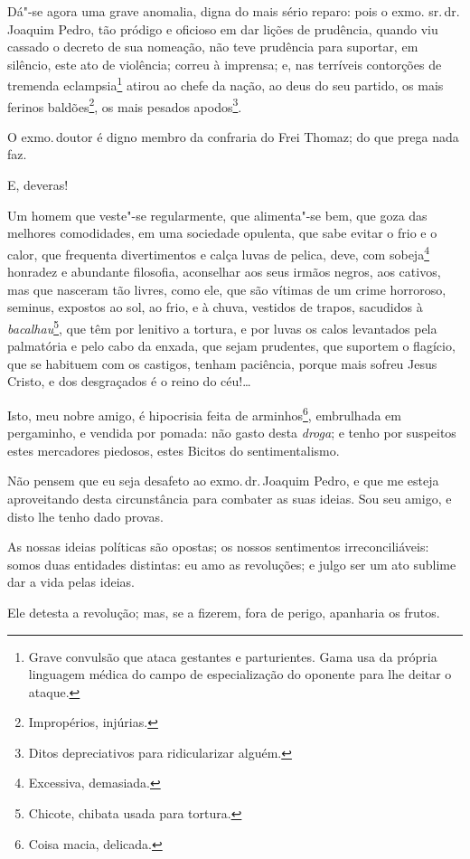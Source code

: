 Dá"-se agora uma grave anomalia, digna do mais sério reparo: pois o exmo.
sr.\,dr.\,Joaquim Pedro, tão pródigo e oficioso em dar lições de
prudência, quando viu cassado o decreto de sua nomeação, não teve
prudência para suportar, em silêncio, este ato de violência; correu à
imprensa; e, nas terríveis contorções de tremenda eclampsia\footnote{
  Grave convulsão que ataca gestantes e parturientes. Gama usa da
  própria linguagem médica do campo de especialização do oponente para
  lhe deitar o ataque.} atirou ao chefe da nação, ao deus do seu
partido, os mais ferinos baldões\footnote{Impropérios, injúrias.}, os
mais pesados apodos\footnote{Ditos depreciativos para ridicularizar
  alguém.}.

O exmo.\,doutor é digno membro da confraria do Frei Thomaz; do que prega
nada faz.

E, deveras!

Um homem que veste"-se regularmente, que alimenta"-se bem, que goza das
melhores comodidades, em uma sociedade opulenta, que sabe evitar o frio
e o calor, que frequenta divertimentos e calça luvas de pelica, deve,
com sobeja\footnote{Excessiva, demasiada.} honradez e abundante
filosofia, aconselhar aos seus irmãos negros, aos cativos, mas que
nasceram tão livres, como ele, que são vítimas de um crime horroroso,
seminus, expostos ao sol, ao frio, e à chuva, vestidos de trapos,
sacudidos à \emph{bacalhau}\footnote{Chicote, chibata usada para
  tortura.}, que têm por lenitivo a tortura, e por luvas os calos
levantados pela palmatória e pelo cabo da enxada, que sejam prudentes,
que suportem o flagício, que se habituem com os castigos, tenham
paciência, porque mais sofreu Jesus Cristo, e dos desgraçados é o reino
do céu!\ldots{}

Isto, meu nobre amigo, é hipocrisia feita de arminhos\footnote{Coisa
  macia, delicada.}, embrulhada em pergaminho, e vendida por pomada: não
gasto desta \emph{droga}; e tenho por suspeitos estes mercadores
piedosos, estes Bicitos do sentimentalismo.

Não pensem que eu seja desafeto ao exmo.\,dr.\,Joaquim Pedro, e que me
esteja aproveitando desta circunstância para combater as suas ideias.
Sou seu amigo, e disto lhe tenho dado provas.

As nossas ideias políticas são opostas; os nossos sentimentos
irreconciliáveis: somos duas entidades distintas: eu amo as revoluções;
e julgo ser um ato sublime dar a vida pelas ideias.

Ele detesta a revolução; mas, se a fizerem, fora de perigo, apanharia os
frutos.

